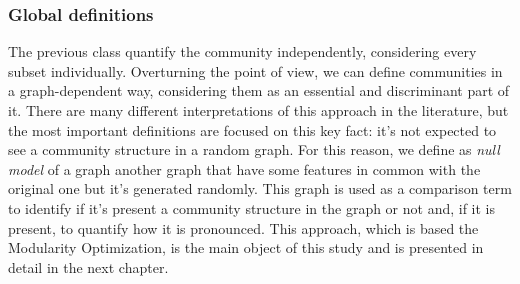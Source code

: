 \subsubsection{Global definitions}
The previous class quantify the community independently, considering every subset individually. Overturning the point of view, we can define communities in a graph-dependent way, considering them as an essential and discriminant part of it. There are many different interpretations of this approach in the literature, but the most important definitions are focused on this key fact: it's not expected to see a community structure in a random graph. For this reason, we define as \textit{null model} of a graph another graph that have some features in common with the original one but it's generated randomly. This graph is used as a comparison term to identify if it's present a community structure in the graph or not and, if it is present, to quantify how it is pronounced.
This approach, which is based the Modularity Optimization, is the main object of this study and is presented in detail in the next chapter.
